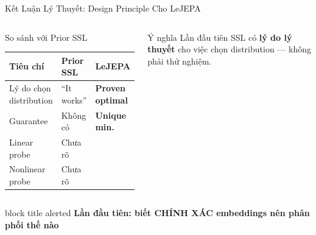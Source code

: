 \documentclass[aspectratio=169,11pt]{beamer}
\newcommand{\cmark}{\ding{51}}
\newcommand{\takeaway}[1]{%
  \vfill
  \begin{beamercolorbox}[sep=4pt,center,rounded=true]{block title alerted}
    \small\bfseries #1
  \end{beamercolorbox}%
}
\begin{document}
\begin{frame}{Kết Luận Lý Thuyết: Design Principle Cho LeJEPA}
\begin{columns}[c]
  \begin{block}{So sánh với Prior SSL}
    \footnotesize
    \renewcommand{\arraystretch}{1.05}
    \begin{tabular}{>{\raggedright\arraybackslash}p{2.1cm}
                    >{\raggedright\arraybackslash}p{1.6cm}
                    >{\raggedright\arraybackslash}p{1.6cm}}
    \toprule
    \textbf{Tiêu chí}
      & \textbf{Prior SSL}
      & \textbf{LeJEPA} \\
    \midrule
    Lý do chọn distribution
      & \cellcolor{bad!15}\tiny ``It works''
      & \cellcolor{good!15}\tiny\bfseries Proven optimal \\
    Guarantee
      & \cellcolor{bad!15}\tiny Không có
      & \cellcolor{good!15}\tiny\bfseries Unique min. \\
    Linear probe
      & \cellcolor{bad!15}\tiny Chưa rõ
      & \cellcolor{good!15}\tiny\bfseries \cmark \\
    Nonlinear probe
      & \cellcolor{bad!15}\tiny Chưa rõ
      & \cellcolor{good!15}\tiny\bfseries \cmark \\
    \bottomrule
    \end{tabular}
  \end{block}
  \begin{exampleblock}{\footnotesize Ý nghĩa}
    \footnotesize
    Lần đầu tiên SSL có \textbf{lý do lý thuyết} cho việc chọn distribution — không phải thử nghiệm.
  \end{exampleblock}
\end{columns}
\takeaway{Lần đầu tiên: biết CHÍNH XÁC embeddings nên phân phối thế nào}
\end{frame}
\end{document}
